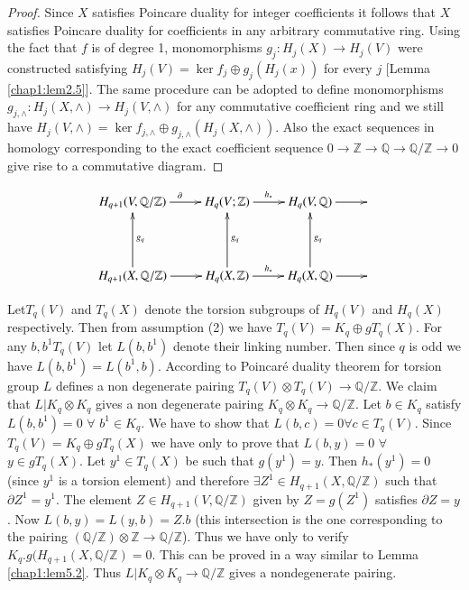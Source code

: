 \begin{proof}
Since $X$ satisfies Poincare duality for integer coefficients it
follows that $ X$ satisfies Poincare duality for coefficients in any
arbitrary commutative ring. Using the fact that $f$ is of degree 1,
monomorphisms $g_j : H_j (X) \to H_j (V)$ were constructed satisfying
$H_j (V) = \ker f_j \oplus g_j (H_j (x))$ for every $j$ [Lemma \ref{chap1:lem2.5}].
The same procedure can be adopted to define monomorphisms
$g_{j,\wedge} : H_j (X, \wedge) \to H_j (V, \wedge )$ for any
commutative coefficient ring and we still have $H_j (V, \wedge) = \ker
f_{j, \wedge} \oplus g_{j, \wedge }(H_j (X, \wedge))$. Also the exact
sequences in homology corresponding to the exact coefficient sequence $
0 \to \mathbb{Z } \to \mathbb{Q} \to \mathbb{ Q}/\mathbb{Z } \to 0$
give rise to a commutative diagram.  
\end{proof}
\[
\xymatrix@R=1.5cm{
H_{q+1} (V, \mathbb{Q}/\mathbb{Z}) \ar[r]^{\partial} & H_q
(V;\mathbb{Z}) \ar[r]^{h_*} & H_q (
V,\mathbb{Q}) \ar[r]  & \\
H_{q+1} (X, \mathbb{Q}/\mathbb{Z}) \ar[r] \ar[u]_{g_q} & H_q (X,
\mathbb{Z}) \ar[r]^{h_*} \ar[u]_{g_q} & H_q(X, \mathbb{Q}) \ar[r]
\ar[u]_{g_q} & 
}
\]

Let\pageoriginale $T_q (V)$ and $T_q(X)$ denote the torsion subgroups
of $H_q (V)$ 
and $H_q (X)$ respectively. Then from assumption (2) we have $T_q (V)
= K_q \oplus g T_q (X)$. For any $b, b^1 T_q (V)$ let $L (b, b^1)$
denote their linking number. Then since $q$ is odd we have $L (b, b^1)
= L(b^1,b)$.   According to Poincar\'e duality theorem for  torsion group
\cite[p. 245]{c1:key7} $L$ defines a non degenerate pairing $T_q (V) \otimes T_q
(V) \to \mathbb{Q}/\mathbb{Z}$. We claim that $L | K_q \otimes K_q$
gives a non degenerate pairing $K_q \otimes K_q \to
\mathbb{Q}/\mathbb{Z}$. Let $b \in K_q$ satisfy $L(b, b^1) = 0$
$\forall$ $b^1 \in K_q$. We have to show that $L (b,c) = 0 \forall c
\in T_q (V)$. Since $T_q (V) = K_q \oplus g T_q (X)$ we have only
to prove that $L( b,  y) = 0$ $\forall$ $y \in g T_q (X)$. Let $y^1
\in T_q (X)$ be such that $g(y^1) = y$. Then $h_* (y^1) = 0$
(since $y^1$ is a torsion element) and therefore $\exists Z^1 \in
H_{q+1} (X, \mathbb{Q}/ \mathbb{Z})$ such that $\partial Z^1 =
y^1$. The element $Z \in H_{q+1} (V, \mathbb{Q}/ \mathbb{Z})$
given by $Z = g(Z^1)$ satisfies $\partial Z = y$. Now $L (b, y) = L
(y, b) = Z. b$ (this intersection is the one corresponding to the
pairing $(\mathbb{Q}/ \mathbb{Z}) \otimes \mathbb{Z} \to\mathbb{Q}/
\mathbb{Z}$). Thus we have only to verify $K_q . g (H_{q+1}(X,
\mathbb{Q}/ \mathbb{Z}) = 0$. This can be proved in a way similar to
Lemma \ref{chap1:lem5.2}. Thus $L | K_q \otimes K_q \to \mathbb{Q}/\mathbb{Z}$ gives
a nondegenerate pairing.  


